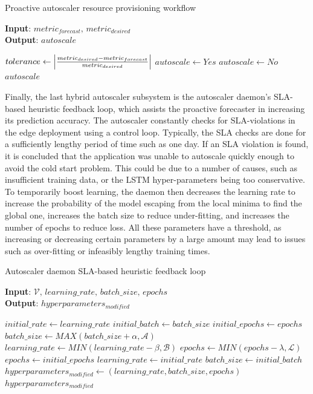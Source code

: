 \begin{algorithm}
    \caption{Proactive autoscaler resource provisioning workflow}
    \label{alg:proactive-resource-provision}
    \textbf{Input}: $metric_{forecast},\, metric_{desired}$\\
    \textbf{Output}: $autoscale$
    \begin{algorithmic}
        \State $tolerance \gets \abs{ \frac{metric_{desired} - metric_{forecast}}{metric_{desired}} }$
            \State $autoscale \gets Yes$
        \Else
            \State $autoscale \gets No$
        \EndIf
        \State \Return $autoscale$
    \end{algorithmic}
\end{algorithm}

Finally, the last hybrid autoscaler subsystem is the autoscaler daemon's SLA-based heuristic feedback loop, which assists the proactive forecaster in increasing its prediction accuracy. The autoscaler constantly checks for SLA-violations in the edge deployment using a control loop. Typically, the SLA checks are done for a sufficiently lengthy period of time such as one day. If an SLA violation is found, it is concluded that the application was unable to autoscale quickly enough to avoid the cold start problem. This could be due to a number of causes, such as insufficient training data, or the LSTM hyper-parameters being too conservative. To temporarily boost learning, the daemon then decreases the learning rate to increase the probability of the model escaping from the local minima to find the global one, increases the batch size to reduce under-fitting, and increases the number of epochs to reduce loss. All these parameters have a threshold, as increasing or decreasing certain parameters by a large amount may lead to issues such as over-fitting or infeasibly lengthy training times.\par

\begin{algorithm}
    \caption{Autoscaler daemon SLA-based heuristic feedback loop}
    \label{alg:sla-heuristic-feedback}
    \textbf{Input}: $\mathcal{V},\,learning\_rate,\,batch\_size,\,epochs$\\
    \textbf{Output}: $hyperparameters_{modified}$
    \begin{algorithmic}
        \State $initial\_rate \gets learning\_rate$
        \State $initial\_batch \gets batch\_size$
        \State $initial\_epochs \gets epochs$
            \State $batch\_size \gets MAX(batch\_size + \alpha, \mathcal{A})$
            \State $learning\_rate \gets MIN(learning\_rate - \beta, \mathcal{B})$
            \State $epochs \gets MIN(epochs - \lambda, \mathcal{L})$
        \Else
            \State $epochs \gets initial\_epochs$
            \State $learning\_rate \gets initial\_rate$
            \State $batch\_size \gets initial\_batch$
        \EndIf
        \State $hyperparameters_{modified} \gets (learning\_rate, batch\_size, epochs)$
        \State \Return $hyperparameters_{modified}$
    \end{algorithmic}
\end{algorithm}

